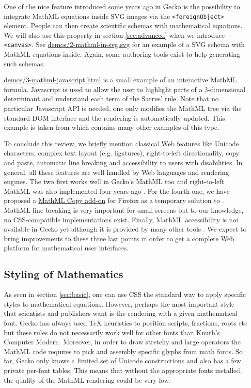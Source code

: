 One of the nice feature introduced some years ago in Gecko is the possibility
to integrate MathML equations inside SVG images via the {\tt <foreignObject>}
element. People can then create
scientific schemas with mathematical equations.
We will also use this property in section \ref{sec:advanced}
when we introduce {\tt <canvas>}.
See \href{http://fred-wang.github.io/MathUI2014/demos/2-mathml-in-svg.svg}{demos/2-mathml-in-svg.svg} for an example of a SVG schema with
MathML equations inside. Again, some authoring tools exist to help generating
such schemas.

\href{http://fred-wang.github.io/MathUI2014/demos/3-mathml-javascript.html}{demos/3-mathml-javascript.html} is a small example of an
interactive MathML formula. Javascript is used to allow the user to highlight
parts of a 3-dimensional determinant and understand each term of the
Sarrus' rule. Note that no particular Javascript API is needed, one only
modifies the MathML tree via the standard DOM interface and the rendering
is automatically updated.
This example is taken from \cite{MathInEbooks} which contains
many other examples of this type.

To conclude this review, we briefly mention classical Web features like
Unicode characters, complex text layout (e.g. ligatures),
right-to-left directionality, copy and paste, automatic line breaking and
accessibility to users with disabilities.
In general, all these features are well handled by Web languages and rendering
engines. The two first works well in Gecko's MathML
too and right-to-left MathML was also implemented four years ago
\cite{BugzillaLTR}.
For the fourth one, we have proposed a
\href{https://addons.mozilla.org/en-US/firefox/addon/mathml-copy/}{MathML Copy add-on} for Firefox as a temporary solution to
\cite{BugzillaClipboard}. MathML line breaking \cite{BugzillaLinebreaking}
is very important
for small screens but to our knowledge, no CSS-compatible implementations exist.
Finally, MathML accessibility is not available in Gecko yet although it is
provided by many other tools \cite{BugzillaAccessibility}. We expect to
bring improvements to these three last points in order to get a complete Web
platform for mathematical user interfaces.

\subsection{Styling of Mathematics}

As seen in section \ref{sec:basic}, one can use CSS the standard way to apply
specific styles to mathematical equations. However, perhaps the most important
style that scientists and publishers want is the rendering with a given
mathematical font. Gecko has always used TeX heuristics to position scripts,
fractions, roots etc but these rules do not necessarily work well for other
fonts than Knuth's Computer Modern. Moreover, in order to draw stretchy and
large operators the MathML code requires to pick and assembly specific glyphs
from math fonts. So far, Gecko only knows a limited set of Unicode constructions
and also has a
few private per-font tables. This means that without the appropriate
fonts installed, the quality of the MathML rendering could be very low.

